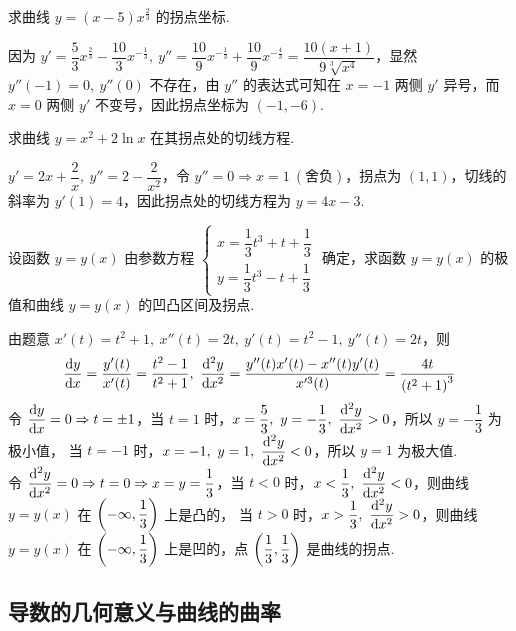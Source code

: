 \begin{example}[2008 数二]
    求曲线 $y=(x-5)x^{\frac{2}{3}}$ 的拐点坐标.
\end{example}
\begin{solution}
    因为 $y'=\dfrac{5}{3}x^{\frac{2}{3}}-\dfrac{10}{3}x^{-\frac{1}{3}},~y''=\dfrac{10}{9}x^{-\frac{1}{3}}+\dfrac{10}{9}x^{-\frac{4}{3}}=\dfrac{10(x+1)}{9\sqrt[3]{x^4}}$，显然 $y''(-1)=0,~y''(0)$ 不存在，由 $y''$ 的表达式可知在 $x=-1$ 两侧 $y'$ 异号，而 $x=0$ 两侧 $y'$ 不变号，因此拐点坐标为 $(-1,-6).$
\end{solution}

\begin{example}[2018 数二]
    求曲线 $y=x^2+2\ln x$ 在其拐点处的切线方程.
\end{example}
\begin{solution}
    $y'=2x+\dfrac{2}{x},~y''=2-\dfrac{2}{x^2}$，令 $y''=0\Rightarrow x=1~(\text{舍负})$，拐点为 $(1,1)$，切线的斜率为 $y'(1)=4$，因此拐点处的切线方程为 $y=4x-3.$
\end{solution}

\begin{example}[2011 数二]
    设函数 $y=y(x)$ 由参数方程 $\begin{cases}
        x=\dfrac{1}{3}t^3+t+\dfrac{1}{3}\\[6pt]
        y=\dfrac{1}{3}t^3-t+\dfrac{1}{3}
    \end{cases}$ 确定，求函数 $y=y(x)$ 的极值和曲线 $y=y(x)$ 的凹凸区间及拐点.
\end{example}
\begin{solution}
    由题意 $x'(t)=t^2+1,~x''(t)=2t,~y'(t)=t^2-1,~y''(t)=2t$，则 
    $$\dv{y}{x}=\dfrac{y'(t)}{x'(t)}=\dfrac{t^2-1}{t^2+1},~\dv[2]{y}{x}=\dfrac{y''(t)x'(t)-x''(t)y'(t)}{x'^3(t)}=\dfrac{4t}{\qty(t^2+1)^3}$$
    令 $\displaystyle\dv{y}{x}=0\Rightarrow t=\pm 1$，当 $t=1$ 时，$\displaystyle x=\dfrac{5}{3},~y=-\dfrac{1}{3},~\dv[2]{y}{x}>0$，所以 $y=-\dfrac{1}{3}$ 为极小值，
    当 $t=-1$ 时，$x=-1,~y=1,~\displaystyle\dv[2]{y}{x}<0$，所以 $y=1$ 为极大值.\\
    令 $\displaystyle\dv[2]{y}{x}=0\Rightarrow t=0\Rightarrow x=y=\dfrac{1}{3}$，当 $t<0$ 时，$x<\dfrac{1}{3},~\displaystyle \dv[2]{y}{x}<0$，则曲线 $y=y(x)$ 在 $\qty(-\infty,\dfrac{1}{3})$ 上是凸的，
    当 $t>0$ 时，$x>\dfrac{1}{3},~\displaystyle\dv[2]{y}{x}>0$，则曲线 $y=y(x)$ 在 $\qty(-\infty,\dfrac{1}{3})$ 上是凹的，点 $\qty(\dfrac{1}{3},\dfrac{1}{3})$ 是曲线的拐点.
\end{solution}

\subsection{导数的几何意义与曲线的曲率}


